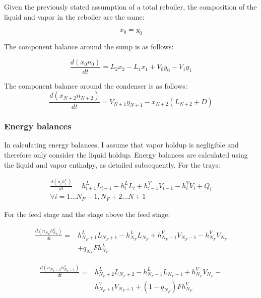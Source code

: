 Given the previously stated assumption of a total reboiler, the composition of the liquid and vapor in the reboiler are the same:

\begin{equation}
    x_0 = y_0
\end{equation}

The component balance around the sump is as follows:

\begin{equation}
    \frac{d(x_{0} n_{0})}{dt} = L_2 x_2 - L_1 x_1 + V_0 y_0 - V_1 y_1
\end{equation}

The component balance around the condenser is as follows:
\begin{equation}
    \frac{d(x_{N+2} n_{N+2})}{dt}  = V_{N+1} y_{N+1} - x_{N+2} (L_{N+2} + D)
\end{equation}

\subsubsection{Energy balances}\label{sec:energy_balances}

In calculating energy balances, I assume that vapor holdup is negligible and therefore only consider the liquid holdup. Energy balances are calculated using the liquid and vapor enthalpy, as detailed subsequently. For the trays:

\begin{equation}
\begin{split}
    \frac{d(n_ih^L_i)}{dt} = h^L_{i+1}L_{i+1}-h^L_iL_i+h^V_{i-1}V_{i-1}-h^V_iV_i + Q_i  \\ \forall i=1 \dots N_F-1, N_F+2 \dots N+1
\end{split}
\end{equation}

For the feed stage and the stage above the feed stage:

\begin{equation}
\begin{split}
    \frac{d(n_{N_F}h^L_{N_F})}{dt} = & h^L_{N_F+1}L_{N_F+1}-h^L_{N_F}L_{N_F} + h^V_{N_F-1}V_{N_F-1}-h^V_{N_F}V_{N_F} \\ &  + q_{N_F}F h^L_{N_F}
\end{split}
\end{equation}


\begin{equation}
\begin{split}
    \frac{d(n_{N_F+1}h^L_{N_F+1})}{dt} = & h^L_{N_F+2}L_{N_F+2}-h^L_{N_F+1}L_{N_F+1} +h^V_{N_F} V_{N_F}-\\ &h^V_{N_F+1} V_{N_F+1} + (1-q_{N_F})Fh^V_{N_F}
\end{split}
\end{equation}

